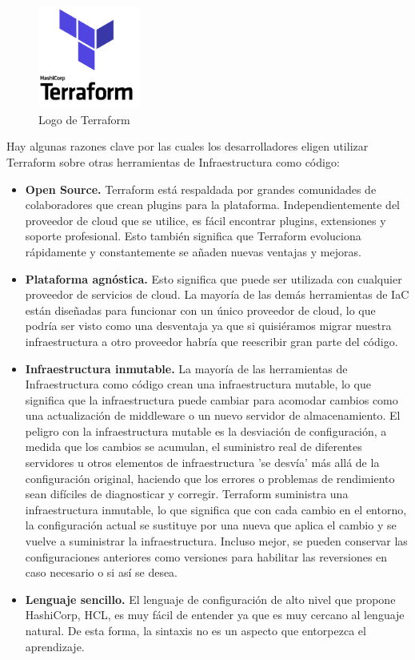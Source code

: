 	\begin{figure}[h]
	\centering
	\includegraphics[width=0.3\textwidth]{../imgs/EdA/terraform.png}
	\caption{Logo de Terraform}
	\label{fig:terraform}
	\end{figure}

	Hay algunas razones clave por las cuales los desarrolladores eligen utilizar Terraform sobre otras herramientas de Infraestructura como código:~\cite{orq5}

	\begin{itemize}
		\item \textbf{Open Source.} Terraform está respaldada por grandes comunidades de colaboradores que crean plugins para la plataforma. Independientemente del proveedor de cloud que se utilice, es fácil encontrar plugins, extensiones y soporte profesional. Esto también significa que Terraform evoluciona rápidamente y constantemente se añaden nuevas ventajas y mejoras.
		\item \textbf{Plataforma agnóstica.} Esto significa que puede ser utilizada con cualquier proveedor de servicios de cloud. La mayoría de las demás herramientas de IaC están diseñadas para funcionar con un único proveedor de cloud, lo que podría ser visto como una desventaja ya que si quisiéramos migrar nuestra infraestructura a otro proveedor habría que reescribir gran parte del código.
		\item \textbf{Infraestructura inmutable.} La mayoría de las herramientas de Infraestructura como código crean una infraestructura mutable, lo que significa que la infraestructura puede cambiar para acomodar cambios como una actualización de middleware o un nuevo servidor de almacenamiento. El peligro con la infraestructura mutable es la desviación de configuración, a medida que los cambios se acumulan, el suministro real de diferentes servidores u otros elementos de infraestructura 'se desvía' más allá de la configuración original, haciendo que los errores o problemas de rendimiento sean difíciles de diagnosticar y corregir. Terraform suministra una infraestructura inmutable, lo que significa que con cada cambio en el entorno, la configuración actual se sustituye por una nueva que aplica el cambio y se vuelve a suministrar la infraestructura. Incluso mejor, se pueden conservar las configuraciones anteriores como versiones para habilitar las reversiones en caso necesario o si así se desea.
		\item \textbf{Lenguaje sencillo.} El lenguaje de configuración de alto nivel que propone HashiCorp, HCL, es muy fácil de entender ya que es muy cercano al lenguaje natural. De esta forma, la sintaxis no es un aspecto que entorpezca el aprendizaje.
	\end{itemize}
	\clearpage

